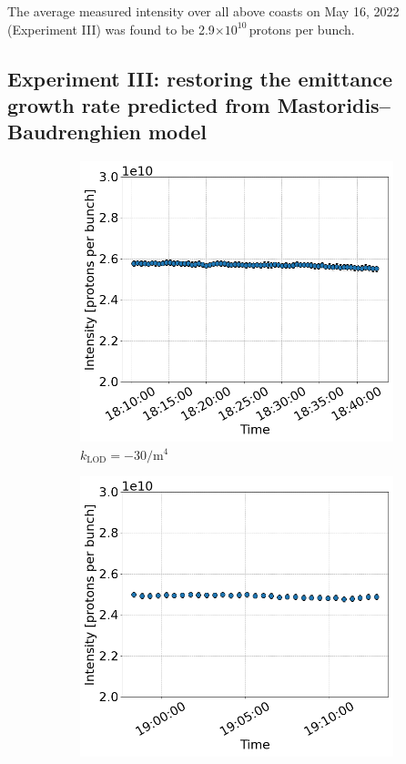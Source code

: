  The average measured intensity over all above coasts on May 16, 2022 (Experiment III) was found to be 2.9$\times 10^{10}$\,protons per bunch. 
 

 \subsection{Experiment III: restoring the emittance growth rate predicted from Mastoridis--Baudrenghien model}\label{subsec:2022_exp3_intensity}

 \begin{figure}[htp]
    \centering
    \begin{subfigure}{.45\textwidth}
        \centering
        \includegraphics[width=.95\linewidth]{images/app_e/intensity_cc_md_12Sep22_coast_6.png}  
        \caption{$k_\mathrm{LOD}=-30 \mathrm{/m^{4}}$}
    \end{subfigure}
    \begin{subfigure}{.45\textwidth}
        \centering
        \includegraphics[width=.95\linewidth]{images/app_e/intensity_cc_md_12Sep22_coast_7.png}  

\end{subfigure}
\end{figure}
